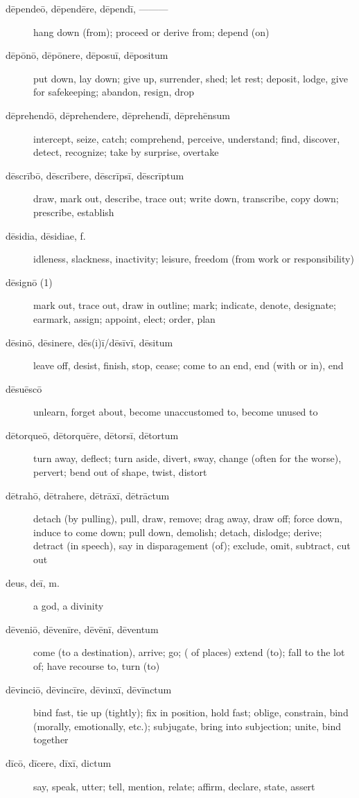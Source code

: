 \begin{description}
    \item[dēpendeō, dēpendēre, dēpendī, ———] hang down (from); proceed or derive from; depend (on)
    \item[dēpōnō, dēpōnere, dēposuī, dēpositum] put down, lay down; give up, surrender, shed; let rest; deposit, lodge, give for safekeeping; abandon, resign, drop
    \item[dēprehendō, dēprehendere, dēprehendī, dēprehēnsum] intercept, seize, catch; comprehend, perceive, understand; find, discover, detect, recognize; take by surprise, overtake
    \item[dēscrībō, dēscrībere, dēscrīpsī, dēscrīptum] draw, mark out, describe, trace out; write down, transcribe, copy down; prescribe, establish
    \item[dēsidia, dēsidiae, f.] idleness, slackness, inactivity; leisure, freedom (from work or responsibility)
    \item[dēsignō (1)] mark out, trace out, draw in outline; mark; indicate, denote, designate; earmark, assign; appoint, elect; order, plan
    \item[dēsinō, dēsinere, dēs(i)ī/dēsīvī, dēsitum] \marginnote{*}leave off, desist, finish, stop, cease; come to an end, end (with or in), end
    \item[dēsuēscō] unlearn, forget about, become unaccustomed to, become unused to
    \item[dētorqueō, dētorquēre, dētorsī, dētortum] turn away, deflect; turn aside, divert, sway, change (often for the worse), pervert; bend out of shape, twist, distort
    \item[dētrahō, dētrahere, dētrāxī, dētrāctum] detach (by pulling), pull, draw, remove; drag away, draw off; force down, induce to come down; pull down, demolish; detach, dislodge; derive; detract (in speech), say in disparagement (of); exclude, omit, subtract, cut out
    \item[deus, deī, m.] \marginnote{*}a god, a divinity
    \item[dēveniō, dēvenīre, dēvēnī, dēventum] come (to a destination), arrive; go; ( of places) extend (to); fall to the lot of; have recourse to, turn (to)
    \item[dēvinciō, dēvincīre, dēvinxī, dēvīnctum] bind fast, tie up (tightly); fix in position, hold fast; oblige, constrain, bind (morally, emotionally, etc.); subjugate, bring into subjection; unite, bind together
    \item[dīcō, dīcere, dīxī, dictum] \marginnote{*}say, speak, utter; tell, mention, relate; affirm, declare, state, assert

\end{description}
